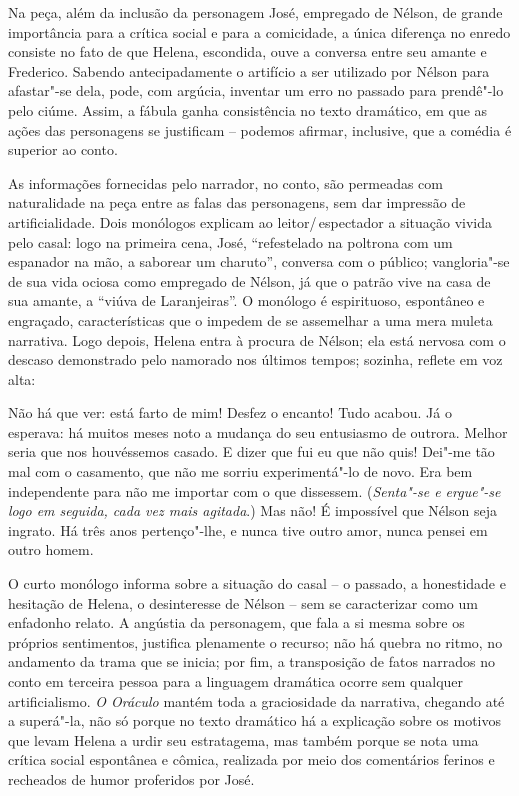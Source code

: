 Na peça, além da inclusão da personagem José, empregado de Nélson, de
grande importância para a crítica social e para a comicidade, a única
diferença no enredo consiste no fato de que Helena, escondida, ouve a
conversa entre seu amante e Frederico. Sabendo antecipadamente o
artifício a ser utilizado por Nélson para afastar"-se dela, pode, com
argúcia, inventar um erro no passado para prendê"-lo pelo ciúme. Assim,
a fábula ganha consistência no texto dramático, em que as ações das
personagens se justificam -- podemos afirmar, inclusive, que a comédia é
superior ao conto. 

As informações fornecidas pelo narrador, no conto, são permeadas com
naturalidade na peça entre as falas das personagens, sem dar impressão
de artificialidade. Dois monólogos explicam ao leitor/\,espectador a
situação vivida pelo casal: logo na primeira cena, José, “refestelado
na poltrona com um espanador na mão, a saborear um charuto”, conversa
com o público; vangloria"-se de sua vida ociosa como empregado de
Nélson, já que o patrão vive na casa de sua amante, a “viúva de
Laranjeiras”. O monólogo é espirituoso, espontâneo e engraçado,
características que o impedem de se assemelhar a uma mera muleta
narrativa. Logo depois, Helena entra à procura de Nélson; ela está
nervosa com o descaso demonstrado pelo namorado nos últimos tempos;
sozinha, reflete em voz alta:

\begin{hedraquote} 
 Não há que ver: está farto de mim! Desfez o encanto! Tudo
acabou. Já o esperava: há muitos meses noto a mudança do seu entusiasmo
de outrora. Melhor seria que nos houvéssemos casado. E dizer que fui eu
que não quis! Dei"-me tão mal com o casamento, que não me sorriu
experimentá"-lo de novo. Era bem independente para não me importar com o
que dissessem. (\textit{Senta"-se e ergue"-se logo em seguida, cada vez
mais agitada}.) Mas não! É impossível que Nélson seja ingrato. Há três
anos pertenço"-lhe, e nunca tive outro amor, nunca pensei em outro
homem.
\end{hedraquote} 

O curto monólogo informa sobre a situação do casal -- o passado, a
honestidade e hesitação de Helena, o desinteresse de Nélson -- sem se
caracterizar como um enfadonho relato. A angústia da personagem, que
fala a si mesma sobre os próprios sentimentos, justifica plenamente o
recurso; não há quebra no ritmo, no andamento da trama que se inicia;
por fim, a transposição de fatos narrados no conto em terceira pessoa
para a linguagem dramática ocorre sem qualquer artificialismo.
\textit{O Oráculo} mantém toda a graciosidade da narrativa, chegando
até a superá"-la, não só porque no texto dramático há a explicação sobre
os motivos que levam Helena a urdir seu estratagema, mas também porque
se nota uma crítica social espontânea e cômica, realizada por meio dos
comentários ferinos e recheados de humor proferidos por José.

